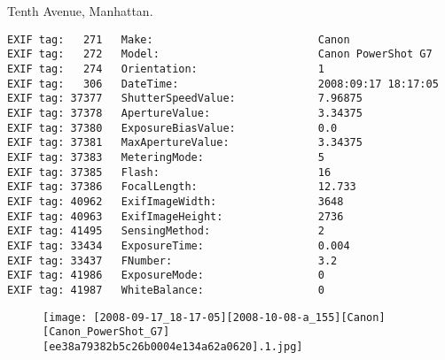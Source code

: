 \section{\protect{}}
\noindent Tenth Avenue, Manhattan.
\noindent
\begin{lstlisting}
EXIF tag:   271   Make:                          Canon
EXIF tag:   272   Model:                         Canon PowerShot G7
EXIF tag:   274   Orientation:                   1
EXIF tag:   306   DateTime:                      2008:09:17 18:17:05
EXIF tag: 37377   ShutterSpeedValue:             7.96875
EXIF tag: 37378   ApertureValue:                 3.34375
EXIF tag: 37380   ExposureBiasValue:             0.0
EXIF tag: 37381   MaxApertureValue:              3.34375
EXIF tag: 37383   MeteringMode:                  5
EXIF tag: 37385   Flash:                         16
EXIF tag: 37386   FocalLength:                   12.733
EXIF tag: 40962   ExifImageWidth:                3648
EXIF tag: 40963   ExifImageHeight:               2736
EXIF tag: 41495   SensingMethod:                 2
EXIF tag: 33434   ExposureTime:                  0.004
EXIF tag: 33437   FNumber:                       3.2
EXIF tag: 41986   ExposureMode:                  0
EXIF tag: 41987   WhiteBalance:                  0

\end{lstlisting}
\clearpage
\begin{figure}
\raggedleft
\texttt{[image: [2008-09-17\_18-17-05][2008-10-08-a\_155][Canon][Canon\_PowerShot\_G7][ee38a79382b5c26b0004e134a62a0620].1.jpg]}
\end{figure}


\clearpage
